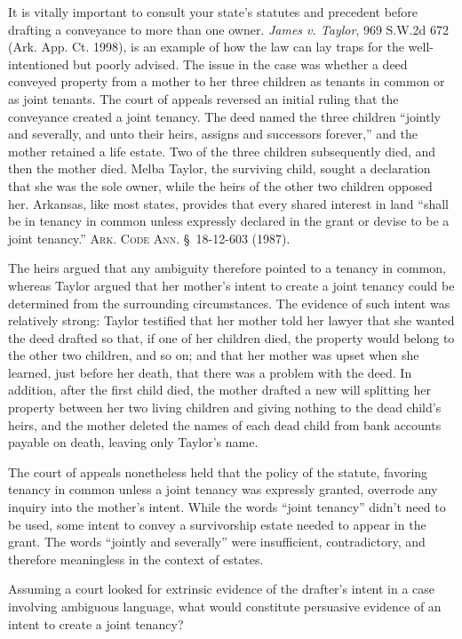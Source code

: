 It is vitally important to consult your state's statutes and precedent before
drafting a conveyance to more than one owner. \emph{James v. Taylor}, 969 S.W.2d
672 (Ark. App. Ct. 1998), is an example of how the law can lay traps for the
well-intentioned but poorly advised. The issue in the case was whether a deed
conveyed property from a mother to her three children as tenants in common or as
joint tenants. The court of appeals reversed an initial ruling that the
conveyance created a joint tenancy. The deed named the three children ``jointly
and severally, and unto their heirs, assigns and successors forever,'' and the
mother retained a life estate. Two of the three children subsequently died, and
then the mother died. Melba Taylor, the surviving child, sought a declaration
that she was the sole owner, while the heirs of the other two children opposed
her. Arkansas, like most states, provides that every shared interest in land
``shall be in tenancy in common unless expressly declared in the grant or devise
to be a joint tenancy.'' \textsc{Ark. Code Ann.} \S~18-12-603 (1987).

The heirs argued that any ambiguity therefore pointed to a tenancy in common,
whereas Taylor argued that her mother's intent to create a joint tenancy could
be determined from the surrounding circumstances. The evidence of such intent
was relatively strong: Taylor testified that her mother told her lawyer that
she wanted the deed drafted so that, if one of her children died, the property
would belong to the other two children, and so on; and that her mother was
upset when she learned, just before her death, that there was a problem with
the deed. In addition, after the first child died, the mother drafted a new
will splitting her property between her two living children and giving nothing
to the dead child's heirs, and the mother deleted the names of each dead child
from bank accounts payable on death, leaving only Taylor's name.

The court of appeals nonetheless held that the policy of the statute, favoring
tenancy in common unless a joint tenancy was expressly granted, overrode any
inquiry into the mother's intent. While the words ``joint tenancy'' didn't
need to be used, some intent to convey a survivorship estate needed to appear
in the grant. The words ``jointly and severally'' were insufficient,
contradictory, and therefore meaningless in the context of estates.

Assuming a court looked for extrinsic evidence of the drafter's intent in a case
involving ambiguous language, what would constitute persuasive evidence of an
intent to create a joint tenancy?

